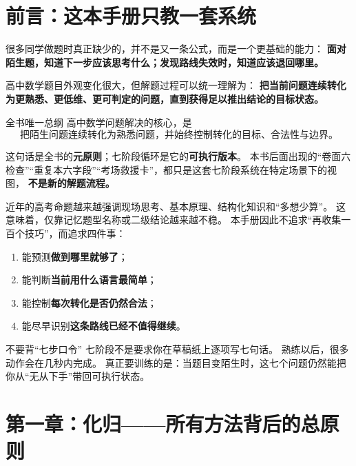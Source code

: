 \documentclass[11pt,a4paper]{ctexart}
\begin{document}
\tableofcontents
\newpage

\section*{前言：这本手册只教一套系统}

很多同学做题时真正缺少的，并不是又一条公式，而是一个更基础的能力：
\textbf{面对陌生题，知道下一步应该思考什么；发现路线失效时，知道应该退回哪里。}

高中数学题目外观变化很大，但解题过程可以统一理解为：
\textbf{把当前问题连续转化为更熟悉、更低维、更可判定的问题，直到获得足以推出结论的目标状态。}

\begin{corebox}{全书唯一总纲}
高中数学问题解决的核心，是
\[
\boxed{\text{把陌生问题连续转化为熟悉问题，并始终控制转化的目标、合法性与边界。}}
\]
\end{corebox}

这句话是全书的\textbf{元原则}；七阶段循环是它的\textbf{可执行版本}。
本书后面出现的“卷面六检查”“重复本六字段”“考场救援卡”，都只是这套七阶段系统在特定场景下的视图，
\textbf{不是新的解题流程。}

近年的高考命题越来越强调现场思考、基本原理、结构化知识和“多想少算”。
这意味着，仅靠记忆题型名称或二级结论越来越不稳。
本手册因此不追求“再收集一百个技巧”，而追求四件事：
\begin{enumerate}
  \item 能预测\textbf{做到哪里就够了}；
  \item 能判断\textbf{当前用什么语言最简单}；
  \item 能控制\textbf{每次转化是否仍然合法}；
  \item 能尽早识别\textbf{这条路线已经不值得继续}。
\end{enumerate}

\begin{warningbox}{不要背“七步口令”}
七阶段不是要求你在草稿纸上逐项写七句话。
熟练以后，很多动作会在几秒内完成。
真正要训练的是：当题目变陌生时，这七个问题仍然能把你从“无从下手”带回可执行状态。
\end{warningbox}

\section{第一章：化归——所有方法背后的总原则}
\end{document}
